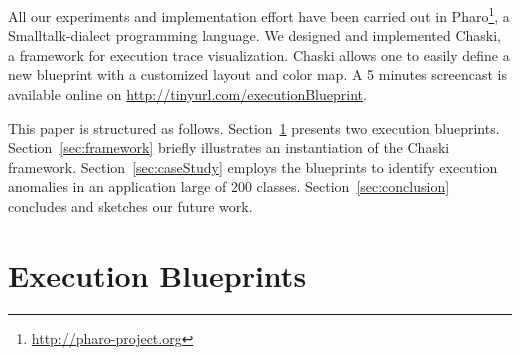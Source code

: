 \documentclass{sig-alternate}
\newcommand{\ab}[1]{\nb{Alexandre}{blue}{#1}}
\newcommand{\seclabel}[1]{\label{sec:#1}}
\newcommand{\secref}[1]{Section~\ref{sec:#1}}
\begin{document}
All our experiments and implementation effort have been carried out in Pharo\footnote{\url{http://pharo-project.org}}, a Smalltalk-dialect programming language. 
We designed and implemented Chaski, a framework for execution trace visualization. Chaski allows one to easily define a new blueprint with a customized layout and color map. A 5 minutes screencast is available online on \url{http://tinyurl.com/executionBlueprint}.

This paper is structured as follows. 
\secref{executionBlueprints} presents two execution blueprints.
\secref{framework} briefly illustrates an instantiation of the Chaski framework.
\secref{caseStudy} employs the blueprints to identify execution anomalies in an application large of 200 classes.
\secref{conclusion} concludes and sketches our future work.


%
%
%
%

\section{Execution Blueprints} \seclabel{executionBlueprints}

%
%
%
\end{document}
